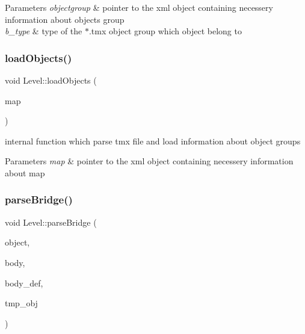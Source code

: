 \begin{DoxyParams}{Parameters}
{\em objectgroup} & pointer to the xml object containing necessery information about objects group \\
\hline
{\em b\+\_\+type} & type of the $\ast$.tmx object group which object belong to \\
\hline
\end{DoxyParams}
\mbox{\label{class_level_a366a0ac7ecbca8e3fa56d8e271d155a9}} 
\subsubsection{\texorpdfstring{load\+Objects()}{loadObjects()}}
{\footnotesize\ttfamily void Level\+::load\+Objects (\begin{DoxyParamCaption}\item[{tinyxml2\+::\+X\+M\+L\+Element $\ast$}]{map }\end{DoxyParamCaption})\hspace{0.3cm}{\ttfamily [private]}}



internal function which parse tmx file and load information about object groups 


\begin{DoxyParams}{Parameters}
{\em map} & pointer to the xml object containing necessery information about map \\
\hline
\end{DoxyParams}
\mbox{\label{class_level_aa1921baab6b1d686f68d81efd235ebc4}} 
\subsubsection{\texorpdfstring{parse\+Bridge()}{parseBridge()}}
{\footnotesize\ttfamily void Level\+::parse\+Bridge (\begin{DoxyParamCaption}\item[{tinyxml2\+::\+X\+M\+L\+Element $\ast$}]{object,  }\item[{b2\+Body $\ast$}]{body,  }\item[{b2\+Body\+Def $\ast$}]{body\+\_\+def,  }\item[{\hyperlink{class_object}{Object} $\ast$}]{tmp\+\_\+obj }\end{DoxyParamCaption})\hspace{0.3cm}{\ttfamily [private]}}



